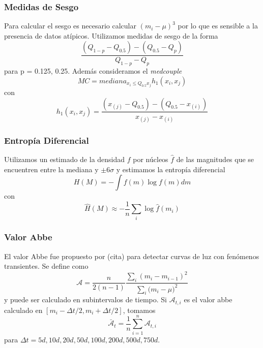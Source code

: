\documentclass{beamer}
\begin{document}
\begin{frame}
  \frametitle{Medidas de Sesgo}
  Para calcular el sesgo es necesario calcular $(m_i-\mu)^3$ por lo que es sensible a la presencia de datos atípicos. Utilizamos medidas de sesgo de la forma 
  \begin{equation}
    \frac{(Q_{1-p}-Q_{0.5})-(Q_{0.5}-Q_p)}{Q_{1-p}-Q_{p}}
  \end{equation}
  para p = 0.125, 0.25. Además consideramos el \textit{medcouple}
  \begin{equation}
    MC = mediana_{x_i\leq Q_{0.5} x_j} h_1(x_i,x_j)
  \end{equation}
  con
  \begin{equation}
    h_1(x_i,x_j) = \frac{(x_{(j)}-Q_{0.5})-(Q_{0.5}-x_{(i)})}{x_{(j)}-x_{(i)}}
  \end{equation}

\end{frame}

\begin{frame}
  \frametitle{Entropía Diferencial}
  Utilizamos un estimado de la densidad $f$ por núcleos $\hat{f}$ de las magnitudes que se encuentren entre la mediana y $\pm 6\sigma$ y estimamos la entropía diferencial 
  \begin{equation}
    H(M) = -\int f(m)\log f(m) dm
  \end{equation}
  con 
  \begin{equation}
    \hat{H}(M) \approx -\frac{1}{n}\sum_i\log\hat{f}(m_i)
  \end{equation}
\end{frame}

\begin{frame}
  \frametitle{Valor Abbe}
  El valor Abbe fue propuesto por (cita) para detectar curvas de luz con fenómenos transientes. Se define como
  \begin{equation}
    \mathcal{A}=\frac{n}{2(n-1)}\frac{\sum_{i}{(m_{i}-m_{i-1})^{2}}}{\sum_{i}{(m_{i}-\mu})^2}
  \end{equation}
  y puede ser calculado en subintervalos de tiempo. Si $\mathcal{A}_{t,i}$ es el valor abbe calculado en $[m_i-\Delta t/2, m_i + \Delta t/2]$, tomamos
  \begin{equation}
    \bar{\mathcal{A}}_t = \frac{1}{n}\sum_{i=1}^{n}\mathcal{A}_{t,i}
  \end{equation}
  para $\Delta t = 5d, 10d, 20d, 50d, 100d, 200d, 500d, 750d.$
\end{frame}
\end{document}
